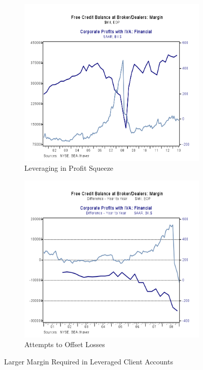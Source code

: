 \begin{figure}[H]
\centering
\begin{subfigure}{.5\textwidth}
  \centering
  \includegraphics[width=1.0\linewidth]{figure/Profits_and_FreeCredit.png}
  \caption{Leveraging in Profit Squeeze }
  \label{fig:leveraging}
\end{subfigure}%
\begin{subfigure}{.5\textwidth}
  \centering
  \includegraphics[width=1.0\linewidth]{figure/DiffYearProfits_and_FreeCredit2.png}
  \caption{Attempts to Offset Losses}
  \label{fig:protectLosses}
\end{subfigure}
\caption{Larger Margin Required in Leveraged Client Accounts}
\label{fig:marginGrowth}
\end{figure}


